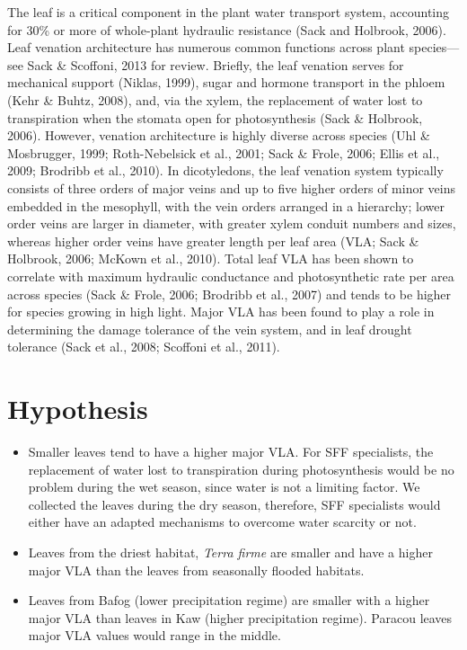 \documentclass[
]{book}
\providecommand{\tightlist}{%
  \setlength{\itemsep}{0pt}\setlength{\parskip}{0pt}}
\begin{document}
The leaf is a critical component in the plant water transport system, accounting for 30\% or more of whole-plant hydraulic resistance (Sack and Holbrook, 2006). Leaf venation architecture has numerous common functions across plant species---see Sack \& Scoffoni, 2013 for review. Briefly, the leaf venation serves for mechanical support (Niklas, 1999), sugar and hormone transport in the phloem (Kehr \& Buhtz, 2008), and, via the xylem, the replacement of water lost to transpiration when the stomata open for photosynthesis (Sack \& Holbrook, 2006). However, venation architecture is highly diverse across species (Uhl \& Mosbrugger, 1999; Roth-Nebelsick et al., 2001; Sack \& Frole, 2006; Ellis et al., 2009; Brodribb et al., 2010). In dicotyledons, the leaf venation system typically consists of three orders of major veins and up to five higher orders of minor veins embedded in the mesophyll, with the vein orders arranged in a hierarchy; lower order veins are larger in diameter, with greater xylem conduit numbers and sizes, whereas higher order veins have greater length per leaf area (VLA; Sack \& Holbrook, 2006; McKown et al., 2010). Total leaf VLA has been shown to correlate with maximum hydraulic conductance and photosynthetic rate per area across species (Sack \& Frole, 2006; Brodribb et al., 2007) and tends to be higher for species growing in high light. Major VLA has been found to play a role in determining the damage tolerance of the vein system, and in leaf drought tolerance (Sack et al., 2008; Scoffoni et al., 2011).

\hypertarget{hypothesis}{%
\section{Hypothesis}\label{hypothesis}}

\begin{itemize}
\tightlist
\item
  Smaller leaves tend to have a higher major VLA. For SFF specialists, the replacement of water lost to transpiration during photosynthesis would be no problem during the wet season, since water is not a limiting factor. We collected the leaves during the dry season, therefore, SFF specialists would either have an adapted mechanisms to overcome water scarcity or not.
\item
  Leaves from the driest habitat, \emph{Terra firme} are smaller and have a higher major VLA than the leaves from seasonally flooded habitats.
\item
  Leaves from Bafog (lower precipitation regime) are smaller with a higher major VLA than leaves in Kaw (higher precipitation regime). Paracou leaves major VLA values would range in the middle.
\end{itemize}
\end{document}
